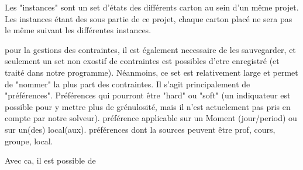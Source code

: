 Les "instances" sont un set d'états des différents carton au sein d'un même projet. Les instances étant des sous partie de ce projet, chaque carton placé ne sera pas le même suivant les différentes instances.

pour la gestions des contraintes, il est également necessaire de les sauvegarder, et seulement un set non exostif de contraintes est possibles d'etre enregistré (et traité dans notre programme). Néanmoins, ce set est relativement large et permet de "nommer" la plus part des contraintes.  Il s'agit principalement de "préférences".  Préférences qui pourront être "hard" ou "soft" (un indiquateur est possible pour y mettre plus de grénulosité, mais il n'est actuelement pas pris en compte par notre solveur).  préférence applicable sur un Moment (jour/period) ou sur un(des) local(aux).  préférences dont la sources peuvent être prof, cours, groupe, local.

Avec ca, il est possible de 



